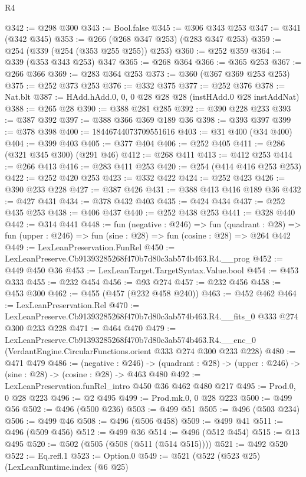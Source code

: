 \begin{lexlean}{R4}
\begin{coremodule}
@342 := @298 @300
@343 := Bool.false
@345 := @306 @343 @253
@347 := @341 (@342 @345)
@353 := @266 (@268 @347 @253) (@283 @347 @253)
@359 := @254 (@339 (@254 (@353 @255 @255)) @253)
@360 := @252 @359
@364 := @339 (@353 @343 @253) @347
@365 := @268 @364
@366 := @365 @253
@367 := @266 @366
@369 := @283 @364 @253
@373 := @360 (@367 @369 @253 @253)
@375 := @252 @373 @253
@376 := @332 @375
@377 := @252 @376
@378 := Nat.blt
@387 := HAdd.hAdd.{0, 0, 0} @28 @28 @28 (instHAdd.{0} @28 instAddNat)
@388 := @265 @28
@390 := @388 @281 @285
@392 := @390 @228 @233
@393 := @387 @392
@397 := @388 @366 @369 @189 @36
@398 := @393 @397
@399 := @378 @398
@400 := 18446744073709551616
@403 := @31 @400 (@34 @400)
@404 := @399 @403
@405 := @377 @404
@406 := @252 @405
@411 := @286 (@321 @345 @300) (@291 @46)
@412 := @268 @411
@413 := @412 @253
@414 := @266 @413
@416 := @283 @411 @253
@420 := @254 (@414 @416 @253 @253)
@422 := @252 @420 @253
@423 := @332 @422
@424 := @252 @423
@426 := @390 @233 @228
@427 := @387 @426
@431 := @388 @413 @416 @189 @36
@432 := @427 @431
@434 := @378 @432 @403
@435 := @424 @434
@437 := @252 @435 @253
@438 := @406 @437
@440 := @252 @438 @253
@441 := @328 @440
@442 := @314 @441
@448 := fun (negative : @246) =>
  fun (quadrant : @28) => fun (upper : @246) => fun (sine : @28) => fun (cosine : @28) => @264 @442
@449 := LexLeanPreservation.FunRel
@450 := LexLeanPreserve.Cb91393285268f470b7d80c3ab574b463.R4.__prog
@452 := @449 @450 @36
@453 := LexLeanTarget.TargetSyntax.Value.bool
@454 := @453 @333
@455 := @232 @454
@456 := @93 @274
@457 := @232 @456
@458 := @453 @300
@462 := @455 (@457 (@232 @458 @240))
@463 := @452 @462
@464 := LexLeanPreservation.Rel
@470 := LexLeanPreserve.Cb91393285268f470b7d80c3ab574b463.R4.__fits_0 @333 @274 @300 @233 @228
@471 := @464 @470
@479 := LexLeanPreserve.Cb91393285268f470b7d80c3ab574b463.R4.__enc_0
    (VerdantEngine.CircularFunctions.orient @333 @274 @300 @233 @228)
@480 := @471 @479
@486 := (negative : @246) ->
  (quadrant : @28) -> (upper : @246) -> (sine : @28) -> (cosine : @28) -> @463 @480
@492 := LexLeanPreservation.funRel_intro @450 @36 @462 @480 @217
@495 := Prod.{0, 0} @28 @223
@496 := @2 @495
@499 := Prod.mk.{0, 0} @28 @223
@500 := @499 @56
@502 := @496 (@500 @236)
@503 := @499 @51
@505 := @496 (@503 @234)
@506 := @499 @46
@508 := @496 (@506 @458)
@509 := @499 @41
@511 := @496 (@509 @456)
@512 := @499 @36
@514 := @496 (@512 @454)
@515 := @13 @495
@520 := @502 (@505 (@508 (@511 (@514 @515))))
@521 := @492 @520
@522 := Eq.refl.{1}
@523 := Option.{0}
@549 := @521
    (@522
      (@523 @25)
      (LexLeanRuntime.index
        (@6 @25)

\end{coremodule}
\end{lexlean}
